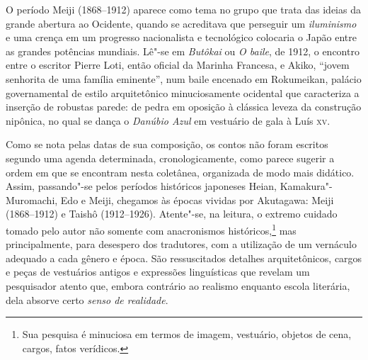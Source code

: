 O período Meiji (1868--1912) aparece como tema no grupo que trata das
ideias da grande abertura ao Ocidente, quando se acreditava que
perseguir um \textit{iluminismo} e uma crença em um progresso nacionalista e
tecnológico colocaria o Japão entre as grandes potências mundiais.
Lê"-se em \textit{Butôkai} ou \textit{O baile}, de 1912, o encontro entre
o escritor Pierre Loti, então oficial da Marinha Francesa, e Akiko,
``jovem senhorita de uma família eminente'', num baile encenado em
Rokumeikan, palácio governamental de estilo arquitetônico
minuciosamente ocidental que caracteriza a inserção de robustas parede:
de pedra em oposição à clássica leveza da construção nipônica, no qual
se dança o \textit{Danúbio Azul} em vestuário de gala à Luís \textsc{xv}.

Como se nota pelas datas de sua composição, os contos não foram escritos
segundo uma agenda determinada, cronologicamente, como parece sugerir a
ordem em que se encontram nesta coletânea, organizada de modo mais
didático. Assim, passando"-se pelos períodos históricos japoneses Heian,
Kamakura"-Muromachi, Edo e Meiji, chegamos às épocas vividas por
Akutagawa: Meiji (1868--1912) e Taishô (1912--1926). Atente"-se, na
leitura, o extremo cuidado tomado pelo autor não somente com
anacronismos históricos,\footnote{Sua pesquisa é minuciosa em termos de imagem,
vestuário, objetos de cena, cargos, fatos verídicos.} mas 
principalmente, para desespero dos tradutores, com a utilização de um
vernáculo adequado a cada gênero e época. São ressuscitados detalhes
arquitetônicos, cargos e peças de vestuários antigos e expressões
linguísticas que revelam um pesquisador atento que, embora contrário ao
realismo enquanto escola literária, dela absorve certo \textit{senso de realidade}.

